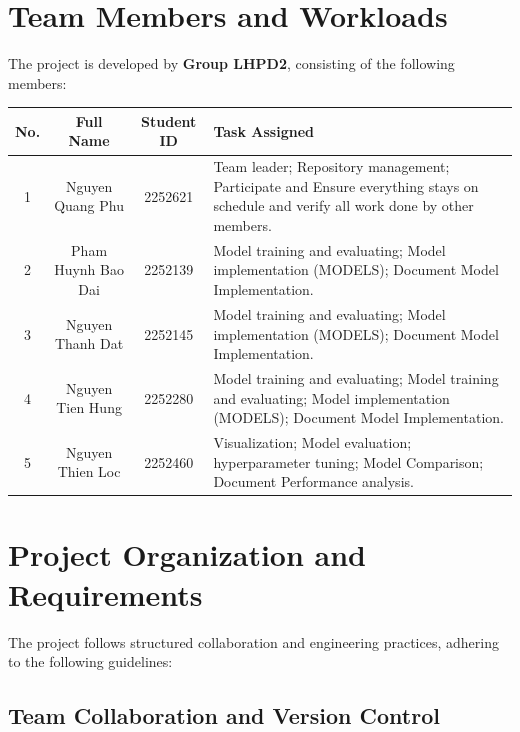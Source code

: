 \section{Team Members and Workloads}

The project is developed by \textbf{Group LHPD2}, consisting of the following members:

\begin{center}
    \renewcommand{\arraystretch}{1.5}
    \begin{tabularx}{\textwidth}{||c|c|c|X||}
    \hline
    \textbf{No.} & \textbf{Full Name} & \textbf{Student ID} & \textbf{Task Assigned} \\
    \hline
    1 & Nguyen Quang Phu & 2252621 & Team leader; Repository management; Participate and Ensure everything stays on schedule and verify all work done by other members. \\
    \hline
    2 & Pham Huynh Bao Dai & 2252139 & Model training and evaluating; Model implementation (MODELS); Document Model Implementation. \\
    \hline
    3 & Nguyen Thanh Dat & 2252145 & Model training and evaluating; Model implementation (MODELS); Document Model Implementation. \\
    \hline
    4 & Nguyen Tien Hung & 2252280 & Model training and evaluating; Model training and evaluating; Model implementation (MODELS); Document Model Implementation. \\
    \hline
    5 & Nguyen Thien Loc & 2252460 & Visualization; Model evaluation; hyperparameter tuning; Model Comparison; Document Performance analysis.  \\
    \hline
    \end{tabularx}
\end{center} 

\section{Project Organization and Requirements}

The project follows structured collaboration and engineering practices, adhering to the following guidelines:

\subsection{Team Collaboration and Version Control}

